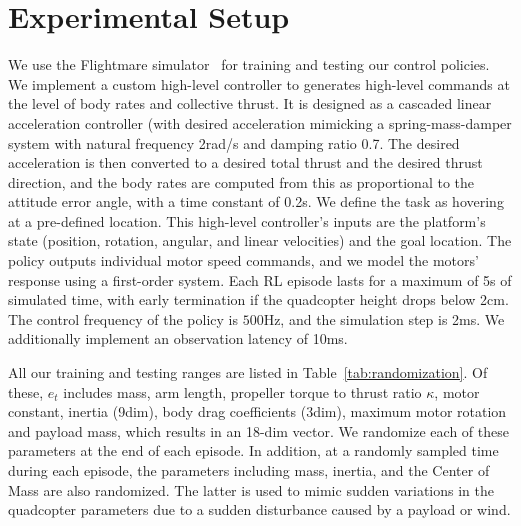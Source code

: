\section{Experimental Setup}

 We use the Flightmare simulator~\cite{song2020flightmare} for training and testing our control policies. 
We implement a custom high-level controller to generates high-level commands at the level of body rates and collective thrust.
It is designed as a cascaded linear acceleration controller (with desired acceleration mimicking a spring-mass-damper system with natural frequency 2rad/s and damping ratio 0.7. The desired acceleration is then converted to a desired total thrust and the desired thrust direction, and the body rates are computed from this as proportional to the attitude error angle, with a time constant of 0.2s.
%
We define the task as hovering at a pre-defined location.
%
This high-level controller's inputs are the platform's state (position, rotation, angular, and linear velocities) and the goal location. 
%
The policy outputs individual motor speed commands, and we model the motors' response using a first-order system.
%
Each RL episode lasts for a maximum of 5s of simulated time, with early termination if the quadcopter height drops below 2cm.
%
The control frequency of the policy is $500$Hz, and the simulation step is 2ms.
%
We additionally implement an observation latency of 10ms.

 All our training and testing ranges are listed in Table~\ref{tab:randomization}. Of these, $e_t$ includes mass, arm length, propeller torque to thrust ratio $\kappa$, motor constant, inertia (9dim), body drag coefficients (3dim), maximum motor rotation and payload mass, which results in an 18-dim vector.
%
We randomize each of these parameters at the end of each episode. In addition, at a randomly sampled time during each episode, the parameters including mass, inertia, and the Center of Mass are also randomized. 
%
The latter is used to mimic sudden variations in the quadcopter parameters due to a sudden disturbance caused by a payload or wind.



